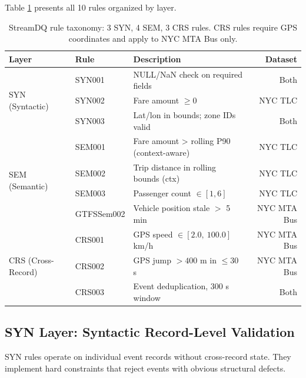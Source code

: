 Table \ref{tab:rule-taxonomy} presents all 10 rules organized by layer.

\begin{table}[htbp]
  \centering
  \caption{StreamDQ rule taxonomy: 3 SYN, 4 SEM, 3 CRS rules.
    CRS rules require GPS coordinates and apply to NYC MTA Bus only.}
  \label{tab:rule-taxonomy}
  \begin{tabular}{lllr}
    \toprule
    Layer     & Rule    & Description                              & Dataset          \\
    \midrule
    \multirow{3}{*}{SYN (Syntactic)}
              & SYN001  & NULL/NaN check on required fields        & Both             \\
              & SYN002  & Fare amount $\geq 0$                     & NYC TLC          \\
              & SYN003  & Lat/lon in bounds; zone IDs valid       & Both             \\
    \midrule
    \multirow{4}{*}{SEM (Semantic)}
              & SEM001  & Fare amount > rolling P90 (context-aware) & NYC TLC      \\
              & SEM002  & Trip distance in rolling bounds (ctx)    & NYC TLC          \\
              & SEM003  & Passenger count $\in [1, 6]$            & NYC TLC          \\
              & GTFSSem002 & Vehicle position stale $>$ 5 min    & NYC MTA Bus      \\
    \midrule
    \multirow{3}{*}{CRS (Cross-Record)}
              & CRS001  & GPS speed $\in [2.0,\ 100.0]$ km/h     & NYC MTA Bus      \\
              & CRS002  & GPS jump $> 400$ m in $\leq 30$ s       & NYC MTA Bus      \\
              & CRS003  & Event deduplication, 300 s window        & Both             \\
    \bottomrule
  \end{tabular}
\end{table}

\subsection{SYN Layer: Syntactic Record-Level Validation}

SYN rules operate on individual event records without cross-record state.
They implement hard constraints that reject events with obvious structural
defects.

